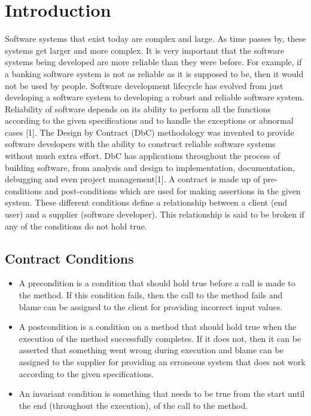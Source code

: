 \chapter{Introduction}

Software systems that exist today are complex and large. As time passes by, these systems get larger and more complex. It is very important that the software systems being developed are more reliable than they were before. For example, if a banking software system is not as reliable as it is supposed to be, then it would not be used by people.
Software development lifecycle has evolved from just developing a software system to developing a robust and reliable software system. Reliability of software depends on its ability to perform all the functions according to the given specifications and to handle the exceptions or abnormal cases [1].
The Design by Contract (DbC) methodology was invented to provide software developers with the ability to construct reliable software systems without much extra effort. DbC has applications throughout the process of building software, from analysis and design to implementation, documentation, debugging and even project management[1]. A contract is made up of pre-conditions and post-conditions which are used for making assertions in the given system. These different conditions define a relationship between a client (end user) and a supplier (software developer). This relationship is said to be broken if any of the conditions do not hold true.



\section{Contract Conditions}

\begin{itemize}
\item A precondition is a condition that should hold true before a call is made to the method. If this condition fails, then the call to the method fails and blame can be assigned to the client for providing incorrect input values.
\item A postcondition is a condition on a method that should hold true when the execution of the method successfully completes. If it does not, then it can be asserted that something went wrong during execution and blame can be assigned to the supplier for providing an erroneous system that does not work according to the given specifications.
\item An invariant condition is something that needs to be true from the start until the end (throughout the execution), of the call to the method.
\end{itemize}

